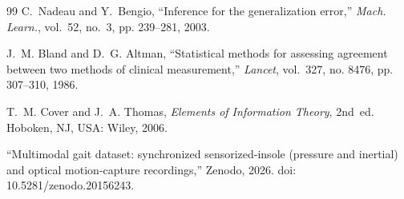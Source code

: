 \documentclass[10pt,conference,a4paper]{IEEEtran}
\begin{document}
\begin{thebibliography}{99}
C.~Nadeau and Y.~Bengio, ``Inference for the generalization error,''
\emph{Mach. Learn.}, vol.~52, no.~3, pp. 239--281, 2003.

J.~M. Bland and D.~G. Altman, ``Statistical methods for assessing agreement
between two methods of clinical measurement,'' \emph{Lancet}, vol.~327, no.
8476, pp. 307--310, 1986.

T.~M. Cover and J.~A. Thomas, \emph{Elements of Information Theory}, 2nd~ed.
Hoboken, NJ, USA: Wiley, 2006.

``Multimodal gait dataset: synchronized sensorized-insole (pressure and
inertial) and optical motion-capture recordings,'' Zenodo, 2026. doi:
10.5281/zenodo.20156243.

\end{thebibliography}
\end{document}
